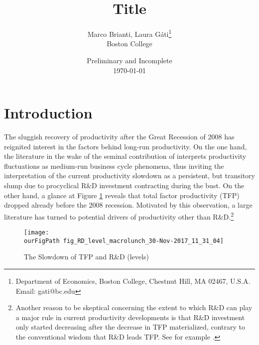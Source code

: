 \documentclass[11pt]{article}
\def \ourFigPath {../../Figures/}
\renewcommand{\[}{\begin{equation}}
\renewcommand{\]}{\end{equation}}
\begin{document}
\linespread{1.0}

\title{Title}
\author{Marco Brianti, Laura G\'ati\thanks{%
Department of Economics, Boston College, Chestnut Hill, MA 02467, U.S.A. Email: gati@bc.edu} \\
 Boston College \\
}
\date{Preliminary and Incomplete \\ \today}
\maketitle



\newpage
\section{Introduction}
The sluggish recovery of productivity after the Great Recession of 2008 has reignited interest in the factors behind long-run productivity. On the one hand, the literature in the wake of the seminal contribution of \cite{comin_gertler2006} interprets productivity fluctuations as medium-run business cycle phenomena, thus inviting the interpretation of the current productivity slowdown as a persistent, but transitory slump due to procyclical R\&D investment contracting during the bust. On the other hand, a glance at Figure \ref{fig_slowdowns} reveals that total factor productivity (TFP) dropped already before the 2008 recession. Motivated by this observation, a large literature has turned to potential drivers of productivity other than R\&D.\footnote{Another reason to be skeptical concerning the extent to which R\&D can play a major rule in current productivity developments is that R\&D investment only started decreasing after the decrease in TFP materialized, contrary to the conventional wisdom that R\&D leads TFP. See for example \cite{guerron_jinnai2013}.} 

\begin{figure}[h!]
\centering
\caption{The Slowdown of TFP and R\&D (levels)}
\texttt{[image: \\ourFigPath fig\_RD\_level\_macrolunch\_30-Nov-2017\_11\_31\_04]}
\label{fig_slowdowns}
\end{figure}
\end{document}
